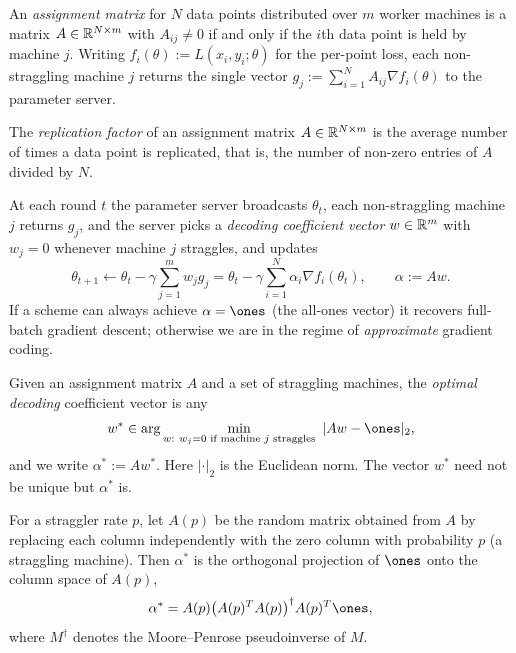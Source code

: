 \begin{definition}
  \label{def:assignment-matrix}
  An \emph{assignment matrix} for $N$ data points distributed over $m$ worker
  machines is a matrix $A \in \mathbb{R}^{N \times m}$ with $A_{ij} \neq 0$ if and only
  if the $i$th data point is held by machine $j$. Writing
  $f_i(\theta) := L(x_i, y_i; \theta)$ for the per-point loss, each
  non-straggling machine $j$ returns the single vector
  $g_j := \sum_{i=1}^N A_{ij} \nabla f_i(\theta)$ to the parameter server.
\end{definition}

\begin{definition}
  \label{def:replication-factor}
  The \emph{replication factor} of an assignment matrix $A \in \mathbb{R}^{N \times m}$
  is the average number of times a data point is replicated, that is, the number
  of non-zero entries of $A$ divided by $N$.
\end{definition}

\begin{definition}
  \label{def:coded-gd}
  At each round $t$ the parameter server broadcasts $\theta_t$, each
  non-straggling machine $j$ returns $g_j$, and the server picks a
  \emph{decoding coefficient vector} $w \in \mathbb{R}^m$ with $w_j = 0$ whenever
  machine $j$ straggles, and updates
  \[
    \theta_{t+1} \leftarrow \theta_t - \gamma \sum_{j=1}^m w_j g_j
      = \theta_t - \gamma \sum_{i=1}^N \alpha_i \nabla f_i(\theta_t),
    \qquad \alpha := Aw .
  \]
  If a scheme can always achieve $\alpha = \ones$ (the all-ones vector) it
  recovers full-batch gradient descent; otherwise we are in the regime of
  \emph{approximate} gradient coding.
\end{definition}

\begin{definition}
  \label{def:optimal-decoding}
  Given an assignment matrix $A$ and a set of straggling machines, the
  \emph{optimal decoding} coefficient vector is any
  \[
    w^* \in \arg\min_{w :\ w_j = 0 \text{ if machine } j \text{ straggles}}
      \ |Aw - \ones|_2 ,
  \]
  and we write $\alpha^* := Aw^*$. Here $|\cdot|_2$ is the Euclidean norm. The
  vector $w^*$ need not be unique but $\alpha^*$ is.
\end{definition}

\begin{definition}
  \label{def:alpha-pseudoinverse}
  For a straggler rate $p$, let $A(p)$ be the random matrix obtained from $A$ by
  replacing each column independently with the zero column with probability $p$
  (a straggling machine). Then $\alpha^*$ is the orthogonal projection of
  $\ones$ onto the column space of $A(p)$,
  \[
    \alpha^* = A(p)\big(A(p)^T A(p)\big)^{\dagger} A(p)^T \ones ,
  \]
  where $M^{\dagger}$ denotes the Moore--Penrose pseudoinverse of $M$.
\end{definition}

